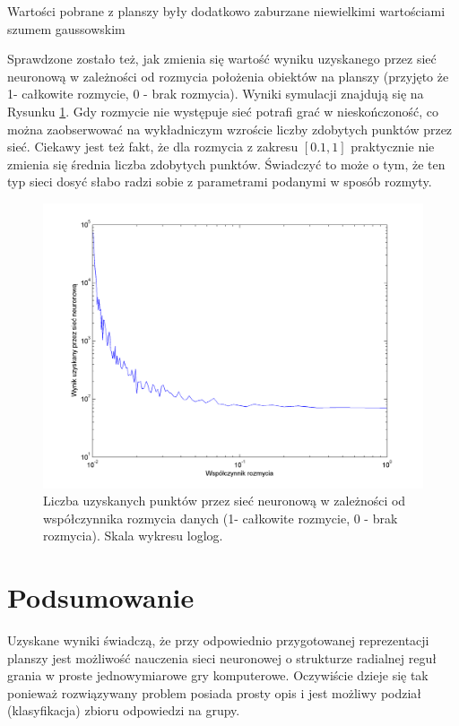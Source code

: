 \documentclass[11pt]{article} %
\begin{document}
Wartości pobrane z planszy były dodatkowo zaburzane niewielkimi wartościami szumem gaussowskim


Sprawdzone zostało też, jak zmienia się wartość wyniku uzyskanego przez sieć neuronową w zależności od rozmycia położenia obiektów na planszy (przyjęto że 1- całkowite rozmycie, 0 - brak rozmycia). Wyniki symulacji znajdują się na Rysunku \ref{fig:fuzzyfication_score}. Gdy rozmycie nie występuje sieć potrafi grać w nieskończoność, co można zaobserwować na wykładniczym wzroście liczby zdobytych punktów przez sieć. Ciekawy jest też fakt, że dla rozmycia z zakresu $[0.1, 1]$ praktycznie nie zmienia się średnia liczba zdobytych punktów. Świadczyć to może o tym, że ten typ sieci dosyć słabo radzi sobie z parametrami podanymi w sposób rozmyty. \\


\begin{figure}[h]
\centering
\includegraphics[width=12cm]{images/fuzzyfication_score}
\caption{Liczba uzyskanych punktów przez sieć neuronową w zależności od współczynnika rozmycia danych (1- całkowite rozmycie, 0 - brak rozmycia). Skala wykresu loglog.} \label{fig:fuzzyfication_score}
\end{figure}





\section{Podsumowanie}

Uzyskane wyniki świadczą, że przy odpowiednio przygotowanej reprezentacji planszy jest możliwość nauczenia sieci neuronowej o strukturze radialnej reguł grania w proste jednowymiarowe gry komputerowe. Oczywiście dzieje się tak ponieważ rozwiązywany problem posiada prosty opis i jest możliwy podział (klasyfikacja) zbioru odpowiedzi na grupy. \\
\end{document}
